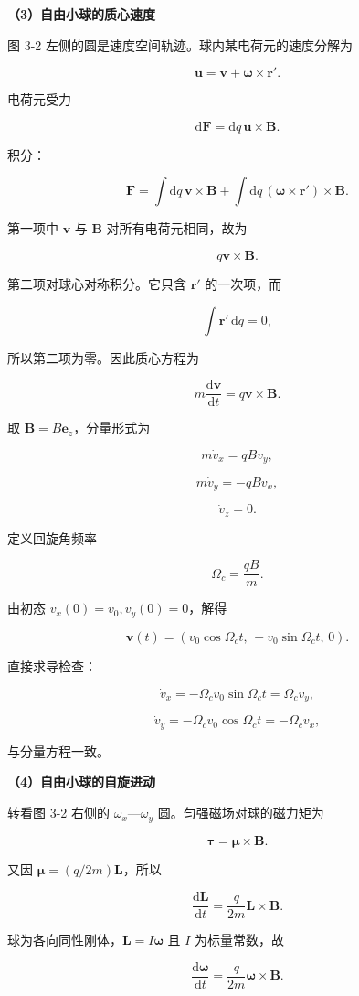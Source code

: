 \documentclass[12pt,a4paper,UTF8]{ctexart}
\begin{document}
\textbf{（3）自由小球的质心速度}

图 3-2 左侧的圆是速度空间轨迹。球内某电荷元的速度分解为

\[\bm u=\bm v+\bm\omega\times\bm r'.\]

电荷元受力

\[\mathrm{d}\bm F=\mathrm{d}q\,\bm u\times\bm B.\]

积分：

\[\bm F=\int \mathrm{d}q\,\bm v\times\bm B
+\int \mathrm{d}q\,(\bm\omega\times\bm r')\times\bm B.\]

第一项中 \(\bm v\) 与 \(\bm B\) 对所有电荷元相同，故为

\[q\bm v\times\bm B.\]

第二项对球心对称积分。它只含 \(\bm r'\) 的一次项，而

\[\int \bm r'\,\mathrm{d}q=0,\]

所以第二项为零。因此质心方程为

\[m\frac{\mathrm{d}\bm v}{\mathrm{d}t}=q\bm v\times\bm B.\]

取 \(\bm B=B\bm e_z\)，分量形式为

\[m\dot v_x=qBv_y,\]

\[m\dot v_y=-qBv_x,\]

\[\dot v_z=0.\]

定义回旋角频率

\[\Omega_c=\frac{qB}{m}.\]

由初态 \(v_x(0)=v_0,v_y(0)=0\)，解得

\[\boxed{
\bm v(t)=
\left(v_0\cos\Omega_ct,\,-v_0\sin\Omega_ct,\,0\right)
}.\]

直接求导检查：

\[\dot v_x=-\Omega_cv_0\sin\Omega_ct=\Omega_cv_y,\]

\[\dot v_y=-\Omega_cv_0\cos\Omega_ct=-\Omega_cv_x,\]

与分量方程一致。

\textbf{（4）自由小球的自旋进动}

转看图 3-2 右侧的 \(\omega_x\)---\(\omega_y\) 圆。匀强磁场对球的磁力矩为

\[\bm\tau=\bm\mu\times\bm B.\]

又因 \(\bm\mu=(q/2m)\bm L\)，所以

\[\frac{\mathrm{d}\bm L}{\mathrm{d}t}=\frac{q}{2m}\bm L\times\bm B.\]

球为各向同性刚体，\(\bm L=I\bm\omega\) 且 \(I\) 为标量常数，故

\[\frac{\mathrm{d}\bm\omega}{\mathrm{d}t}=\frac{q}{2m}\bm\omega\times\bm B.\]
\end{document}
